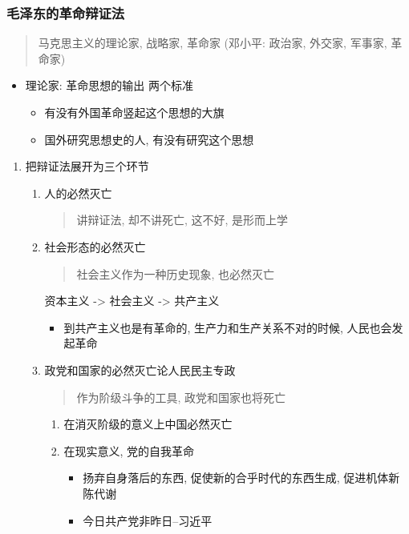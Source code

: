 \documentclass[11pt]{article}
\begin{document}
\subsubsection{毛泽东的革命辩证法}
\label{sec:orgb2e7bd4}
\begin{quote}
马克思主义的理论家, 战略家, 革命家
(邓小平: 政治家, 外交家, 军事家, 革命家)
\end{quote}
\begin{itemize}
\item 理论家: 革命思想的输出
两个标准
\begin{itemize}
\item 有没有外国革命竖起这个思想的大旗
\item 国外研究思想史的人, 有没有研究这个思想
\end{itemize}
\end{itemize}
\begin{enumerate}
\item 把辩证法展开为三个环节
\label{sec:orgbeb98c2}
\begin{enumerate}
\item 人的必然灭亡
\label{sec:orgc030fbc}
\begin{quote}
讲辩证法, 却不讲死亡, 这不好, 是形而上学
\end{quote}
\item 社会形态的必然灭亡
\label{sec:org119c307}
\begin{quote}
社会主义作为一种历史现象, 也必然灭亡
\end{quote}
资本主义 -> 社会主义 -> 共产主义
\begin{itemize}
\item 到共产主义也是有革命的, 生产力和生产关系不对的时候, 人民也会发起革命
\end{itemize}
\item 政党和国家的必然灭亡\hfill{}\textsc{论人民民主专政}
\label{sec:orgec1c862}
\begin{quote}
作为阶级斗争的工具, 政党和国家也将死亡
\end{quote}
\begin{enumerate}
\item 在消灭阶级的意义上中国必然灭亡
\label{sec:orga5ad331}
\item 在现实意义, 党的自我革命
\label{sec:org6b51ca3}
\begin{itemize}
\item 扬弃自身落后的东西, 促使新的合乎时代的东西生成, 促进机体新陈代谢
\item 今日共产党非昨日--习近平
\end{itemize}
\end{enumerate}
\end{enumerate}
\end{enumerate}
\end{document}

